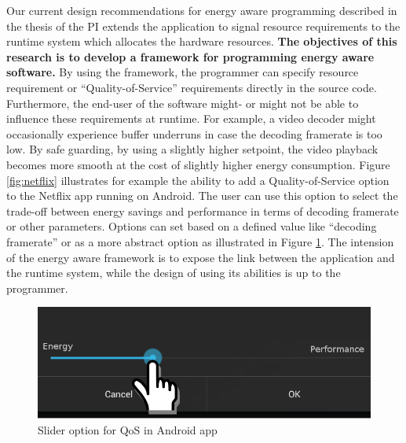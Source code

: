 \documentclass{article}
\begin{document}
Our current design recommendations for energy aware programming described in the thesis of the PI extends the application to signal resource requirements to the runtime system which allocates the hardware resources.
\textbf{The objectives of this research is to develop a framework for programming energy aware software.}
By using the framework, the programmer can specify resource requirement or ``Quality-of-Service'' requirements directly in the source code.
Furthermore, the end-user of the software might- or might not be able to influence these requirements at runtime.
For example, a video decoder might occasionally experience buffer underruns in case the decoding framerate is too low.
By safe guarding, by using a slightly higher setpoint, the video playback becomes more smooth at the cost of slightly higher energy consumption.
Figure \ref{fig:netflix} illustrates for example the ability to add a Quality-of-Service option to the Netflix app running on Android.
The user can use this option to select the trade-off between energy savings and performance in terms of decoding framerate or other parameters. 
Options can set based on a defined value like ``decoding framerate'' or as a more abstract option as illustrated in Figure \ref{fig:slider}. 
The intension of the energy aware framework is to expose the link between the application and the runtime system, while the design of using its abilities is up to the programmer.
\begin{figure}[h]
\captionsetup{justification=raggedright,
singlelinecheck=false
}
	\includegraphics[scale=0.45,left]{fig/slider.png}
	\caption{Slider option for QoS in Android app}
	\label{fig:slider}

\end{figure}

\end{document}
